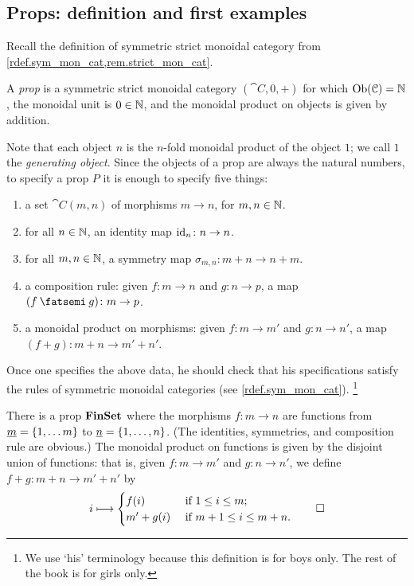 \documentclass[7Sketches]{subfiles}
\begin{document}
\subsection{Props: definition and first examples}

Recall the definition of symmetric strict monoidal category from
\cref{rdef.sym_mon_cat,rem.strict_mon_cat}.

\begin{definition}%
\label{def.prop}%
A \emph{prop} is a symmetric strict monoidal category $(\cat{C},0,+)$ for which $\operatorname{Ob}(\mathcal{C})=\mathbb{N}$, the monoidal unit is $0\in\mathbb{N}$, and the monoidal product on objects is given by addition.
\end{definition}

Note that each object $n$ is the $n$-fold monoidal product of the object $1$; we
call $1$ the \emph{generating object}. Since the objects of a prop are always
the natural numbers, to specify a prop $P$ it is enough to specify five things:
\begin{enumerate}[label=(\roman*)]
	\item a set $\cat{C}(m,n)$ of morphisms $m\to n$, for $m,n\in\mathbb{N}$.
	\item for all $n \in \mathbb{N}$, an identity map $\mathrm{id}_n\colon n \to n$.
	\item for all $m, n \in \mathbb{N}$, a symmetry map $\sigma_{m,n}\colon m+n \to
	n+m$.%
	\item a composition rule: given $f\colon m \to n$ and $g\colon n \to p$,
	a map $(f\cp g)\colon m \to p$.
	\item a monoidal product on morphisms: given $f\colon m\to m'$ and $g\colon n\to n'$, a map $(f+g)\colon m+n\to m'+n'$.
\end{enumerate}
Once one specifies the above data, he should check that his specifications
satisfy the rules of symmetric monoidal categories (see
\cref{rdef.sym_mon_cat}).%
\footnote{We use `his' terminology because this definition is for boys only. The rest of the book is for girls only.}

\begin{example}%
\label{ex.FinSet_Prop}%
  There is a prop $\mathbf{FinSet}$ where the morphisms $f\colon m \to n$ are
  functions from $\underline{{m}}=\{1,\dots m\}$ to $\underline{{n}}=\{1,\dots,n \}$. (The
  identities, symmetries, and composition rule are obvious.) The monoidal
  product on functions is given by the disjoint union of functions: that is,
  given $f\colon m \to m'$ and $g\colon n \to n'$, we
  define $f+ g\colon m+n \longrightarrow m'+n'$ by
  \begin{equation}%
\label{eqn.mon_prod_finset}
    i \longmapsto 
    \begin{cases}
      f(i) &\mbox{ if }1\leq i\leq m ;\\
      m'+g(i) &\mbox{ if }m+1\leq i \leq m+n.
    \end{cases}
    \qedhere
  \end{equation}
\end{example}
\end{document}
